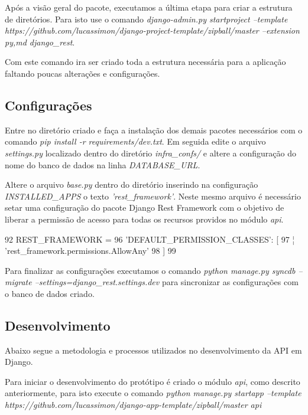   Após a visão geral do pacote, executamos a última etapa para criar a estrutura de diretórios. Para isto use o comando
  \textit{django-admin.py startproject --template https://github.com/lucassimon/django-project-template/zipball/master --extension py,md django_rest}.
  
  Com este comando ira ser criado toda a estrutura necessária para a aplicação faltando poucas alterações e configurações.
  
\subsection{Configurações}

  Entre no diretório criado e faça a instalação dos demais pacotes necessários com o comando \textit{pip install -r requirements/dev.txt}.
  Em seguida edite o arquivo \textit{settings.py} localizado dentro do diretório \textit{infra_confs/} e altere a configuração
  do nome do banco de dados na linha \textit{DATABASE_URL}.
  
  Altere o arquivo \textit{base.py} dentro do diretório  inserindo na configuração \textit{INSTALLED_APPS}
  o texto \textit{'rest_framework'}. Neste mesmo arquivo é necessário setar uma configuração do pacote Django Rest Framework
  com o objetivo de liberar a permissão de acesso para todas os recursos providos no módulo \textit{api}.
  
  92 REST_FRAMEWORK = {
  96     'DEFAULT_PERMISSION_CLASSES': [
  97     ¦   'rest_framework.permissions.AllowAny'
  98     ]
  99 }
  
  Para finalizar as configurações executamos o comando \textit{python manage.py syncdb --migrate --settings=django_rest.settings.dev}
  para sincronizar as configurações com o banco de dados criado.
  
  

\subsection{Desenvolvimento}

  Abaixo segue a metodologia e processos utilizados no desenvolvimento da API em Django.
  
  Para iniciar o desenvolvimento do protótipo é criado o módulo \textit{api}, como descrito anteriormente,
  para isto execute o comando \textit{python manage.py startapp --template https://github.com/lucassimon/django-app-template/zipball/master api}
  
